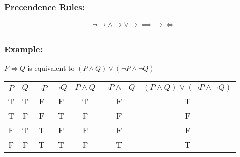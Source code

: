 \documentclass{article}
\begin{document}
\subsubsection{Precendence Rules:}
\begin{align*}
 	& \neg \rightarrow \wedge \rightarrow \vee \rightarrow \implies \rightarrow \iff \\
\end{align*}
\subsubsection{Example:}
$P \iff Q$ is equivalent to $(P \wedge Q) \vee (\neg P \wedge \neg Q)$
\begin{center}	
\begin{tabular}{|| c | c | c | c | c | c | c ||}
\hline\hline
$P$ & $Q$ & $\neg P$ & $\neg Q$ & $P \wedge Q$ & $\neg P \wedge \neg Q$ & $(P \wedge Q) \vee (\neg P \wedge \neg Q)$ \\ [0.5ex] 
\hline\hline
T & T & F & F & T & F & T \\
\hline
T & F & F & T & F & F & F \\
\hline
F & T & T & F & F & F & F \\
\hline
F & F & T & T & F & T & T \\
\hline\hline
\end{tabular}
\end{center}
\end{document}

